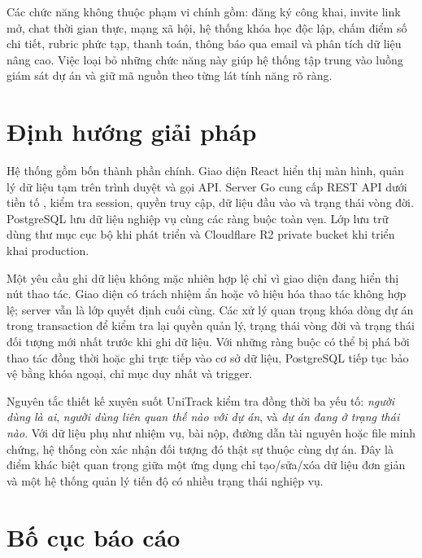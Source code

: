 Các chức năng không thuộc phạm vi chính gồm: đăng ký công khai, invite link mở, chat thời gian thực, mạng xã hội, hệ thống khóa học độc lập, chấm điểm số chi tiết, rubric phức tạp, thanh toán, thông báo qua email và phân tích dữ liệu nâng cao. Việc loại bỏ những chức năng này giúp hệ thống tập trung vào luồng giám sát dự án và giữ mã nguồn theo từng lát tính năng rõ ràng.

\section{Định hướng giải pháp}

Hệ thống gồm bốn thành phần chính. Giao diện React hiển thị màn hình, quản lý dữ liệu tạm trên trình duyệt và gọi API. Server Go cung cấp REST API dưới tiền tố , kiểm tra session, quyền truy cập, dữ liệu đầu vào và trạng thái vòng đời. PostgreSQL lưu dữ liệu nghiệp vụ cùng các ràng buộc toàn vẹn. Lớp lưu trữ dùng thư mục cục bộ khi phát triển và Cloudflare R2 private bucket khi triển khai production.

\figSolutionOverview

Một yêu cầu ghi dữ liệu không mặc nhiên hợp lệ chỉ vì giao diện đang hiển thị nút thao tác. Giao diện có trách nhiệm ẩn hoặc vô hiệu hóa thao tác không hợp lệ; server vẫn là lớp quyết định cuối cùng. Các xử lý quan trọng khóa dòng dự án trong transaction để kiểm tra lại quyền quản lý, trạng thái vòng đời và trạng thái đối tượng mới nhất trước khi ghi dữ liệu. Với những ràng buộc có thể bị phá bởi thao tác đồng thời hoặc ghi trực tiếp vào cơ sở dữ liệu, PostgreSQL tiếp tục bảo vệ bằng khóa ngoại, chỉ mục duy nhất và trigger.

\begin{artifactnote}{Nguyên tắc thiết kế xuyên suốt}
UniTrack kiểm tra đồng thời ba yếu tố: \textit{người dùng là ai}, \textit{người dùng liên quan thế nào với dự án}, và \textit{dự án đang ở trạng thái nào}. Với dữ liệu phụ như nhiệm vụ, bài nộp, đường dẫn tài nguyên hoặc file minh chứng, hệ thống còn xác nhận đối tượng đó thật sự thuộc cùng dự án. Đây là điểm khác biệt quan trọng giữa một ứng dụng chỉ tạo/sửa/xóa dữ liệu đơn giản và một hệ thống quản lý tiến độ có nhiều trạng thái nghiệp vụ.
\end{artifactnote}

\section{Bố cục báo cáo}


